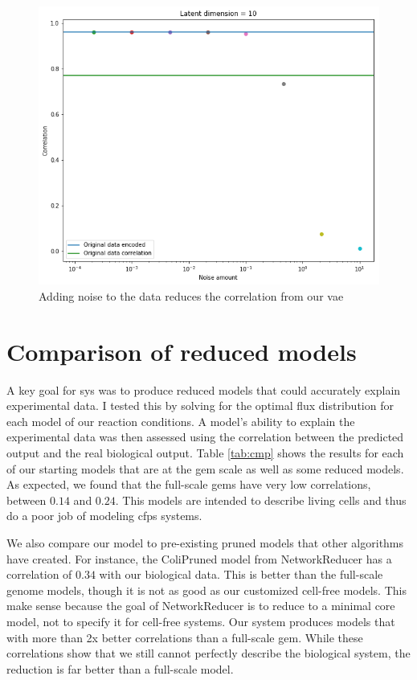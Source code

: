 \begin{figure}[t!]
\begin{center}
\includegraphics[width=1.01\textwidth]{figs/Noise_add.png}
\caption[Noise added to input data reduces the efficacy of a Corr-VAE]{Adding noise to the data reduces the correlation from our \gls{vae}}
\label{fig:noise}
\end{center}
\end{figure}

\section{Comparison of reduced models}\label{sec:cmp}
A key goal for \gls{sys} was to produce reduced models that could accurately explain experimental data.
I tested this by solving for the optimal flux distribution for each model of our reaction conditions.
A model's ability to explain the experimental data was then assessed using the correlation between the predicted output and the real biological output.
Table \ref{tab:cmp} shows the results for each of our starting models that are at the \gls{gem} scale as well as some reduced models.
As expected, we found that the full-scale \glspl{gem} have very low correlations, between $0.14$ and $0.24$.
This models are intended to describe living \ecoli cells and thus do a poor job of modeling \gls{cfps} systems.

We also compare our model to pre-existing pruned models that other algorithms have created.
For instance, the ColiPruned model from NetworkReducer has a correlation of $0.34$ with our biological data.
This is better than the full-scale genome models, though it is not as good as our customized cell-free models.
This make sense because the goal of NetworkReducer is to reduce to a minimal core model, not to specify it for cell-free systems.
Our system produces models that with more than 2x better correlations than a full-scale \gls{gem}.
While these correlations show that we still cannot perfectly describe the biological system, the reduction is far better than a full-scale model.

